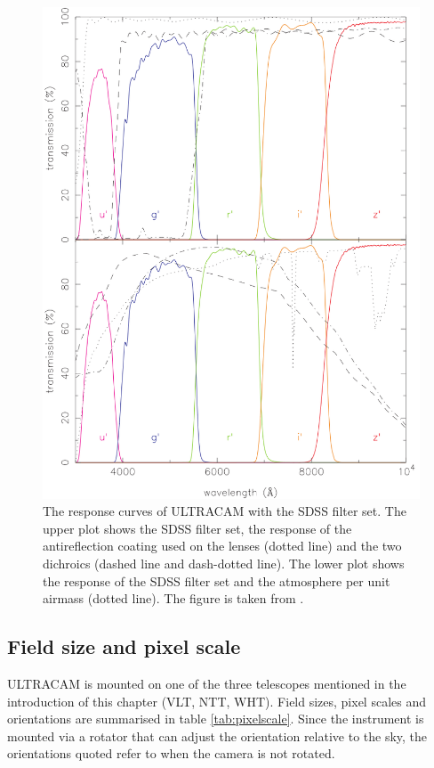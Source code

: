 \begin{figure}
\centering
\includegraphics[width=130mm]{images/ucamresponsecurves.png}
\caption{The response curves of ULTRACAM with the SDSS filter set. The upper plot shows the SDSS filter set, the response of the antireflection coating used on the lenses (dotted line) and the two dichroics (dashed line and dash-dotted line). The lower plot shows the response of the SDSS filter set and the atmosphere per unit airmass (dotted line). The figure is taken from \citet{dhillon07}.}
\label{fig:responsecurves}
\end{figure}


\subsection{Field size and pixel scale}
ULTRACAM is mounted on one of the three telescopes mentioned in the introduction of this chapter (VLT, NTT, WHT). Field sizes, pixel scales and orientations are summarised in table \ref{tab:pixelscale}. Since the instrument is mounted via a rotator that can adjust the orientation relative to the sky, the orientations quoted refer to when the camera is not rotated. 

